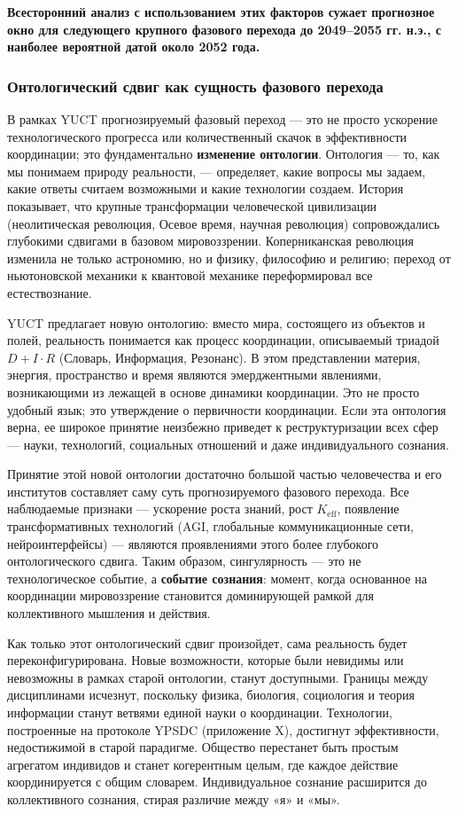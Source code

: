 \documentclass[12pt,a4paper]{article}
\theoremstyle{remark}
\begin{document}
	\textbf{Всесторонний анализ с использованием этих факторов сужает прогнозное окно для следующего крупного фазового перехода до 2049–2055 гг. н.э., с наиболее вероятной датой около 2052 года.}
	
	\subsubsection{Онтологический сдвиг как сущность фазового перехода}
	\label{subsubsec:ontological-shift}
	
	В рамках YUCT прогнозируемый фазовый переход — это не просто ускорение технологического прогресса или количественный скачок в эффективности координации; это фундаментально \textbf{изменение онтологии}. Онтология — то, как мы понимаем природу реальности, — определяет, какие вопросы мы задаем, какие ответы считаем возможными и какие технологии создаем. История показывает, что крупные трансформации человеческой цивилизации (неолитическая революция, Осевое время, научная революция) сопровождались глубокими сдвигами в базовом мировоззрении. Коперниканская революция изменила не только астрономию, но и физику, философию и религию; переход от ньютоновской механики к квантовой механике переформировал все естествознание.
	
	YUCT предлагает новую онтологию: вместо мира, состоящего из объектов и полей, реальность понимается как процесс координации, описываемый триадой $D + I \cdot R$ (Словарь, Информация, Резонанс). В этом представлении материя, энергия, пространство и время являются эмерджентными явлениями, возникающими из лежащей в основе динамики координации. Это не просто удобный язык; это утверждение о первичности координации. Если эта онтология верна, ее широкое принятие неизбежно приведет к реструктуризации всех сфер — науки, технологий, социальных отношений и даже индивидуального сознания.
	
	Принятие этой новой онтологии достаточно большой частью человечества и его институтов составляет саму суть прогнозируемого фазового перехода. Все наблюдаемые признаки — ускорение роста знаний, рост $K_{\text{eff}}$, появление трансформативных технологий (AGI, глобальные коммуникационные сети, нейроинтерфейсы) — являются проявлениями этого более глубокого онтологического сдвига. Таким образом, сингулярность — это не технологическое событие, а \textbf{событие сознания}: момент, когда основанное на координации мировоззрение становится доминирующей рамкой для коллективного мышления и действия.
	
	Как только этот онтологический сдвиг произойдет, сама реальность будет переконфигурирована. Новые возможности, которые были невидимы или невозможны в рамках старой онтологии, станут доступными. Границы между дисциплинами исчезнут, поскольку физика, биология, социология и теория информации станут ветвями единой науки о координации. Технологии, построенные на протоколе YPSDC (приложение X), достигнут эффективности, недостижимой в старой парадигме. Общество перестанет быть простым агрегатом индивидов и станет когерентным целым, где каждое действие координируется с общим словарем. Индивидуальное сознание расширится до коллективного сознания, стирая различие между «я» и «мы».
	
\end{document}
